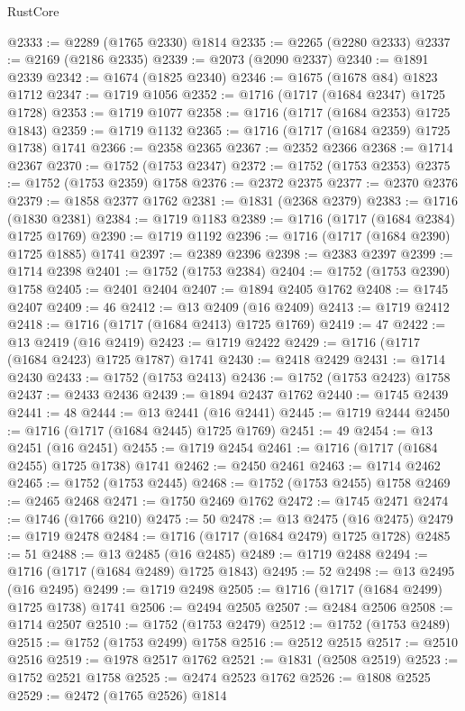 \begin{lexlean}{RustCore}
\begin{coremodule}
@2333 := @2289 (@1765 @2330) @1814
@2335 := @2265 (@2280 @2333)
@2337 := @2169 (@2186 @2335)
@2339 := @2073 (@2090 @2337)
@2340 := @1891 @2339
@2342 := @1674 (@1825 @2340)
@2346 := @1675 (@1678 @84) @1823 @1712
@2347 := @1719 @1056
@2352 := @1716 (@1717 (@1684 @2347) @1725 @1728)
@2353 := @1719 @1077
@2358 := @1716 (@1717 (@1684 @2353) @1725 @1843)
@2359 := @1719 @1132
@2365 := @1716 (@1717 (@1684 @2359) @1725 @1738) @1741
@2366 := @2358 @2365
@2367 := @2352 @2366
@2368 := @1714 @2367
@2370 := @1752 (@1753 @2347)
@2372 := @1752 (@1753 @2353)
@2375 := @1752 (@1753 @2359) @1758
@2376 := @2372 @2375
@2377 := @2370 @2376
@2379 := @1858 @2377 @1762
@2381 := @1831 (@2368 @2379)
@2383 := @1716 (@1830 @2381)
@2384 := @1719 @1183
@2389 := @1716 (@1717 (@1684 @2384) @1725 @1769)
@2390 := @1719 @1192
@2396 := @1716 (@1717 (@1684 @2390) @1725 @1885) @1741
@2397 := @2389 @2396
@2398 := @2383 @2397
@2399 := @1714 @2398
@2401 := @1752 (@1753 @2384)
@2404 := @1752 (@1753 @2390) @1758
@2405 := @2401 @2404
@2407 := @1894 @2405 @1762
@2408 := @1745 @2407
@2409 := 46
@2412 := @13 @2409 (@16 @2409)
@2413 := @1719 @2412
@2418 := @1716 (@1717 (@1684 @2413) @1725 @1769)
@2419 := 47
@2422 := @13 @2419 (@16 @2419)
@2423 := @1719 @2422
@2429 := @1716 (@1717 (@1684 @2423) @1725 @1787) @1741
@2430 := @2418 @2429
@2431 := @1714 @2430
@2433 := @1752 (@1753 @2413)
@2436 := @1752 (@1753 @2423) @1758
@2437 := @2433 @2436
@2439 := @1894 @2437 @1762
@2440 := @1745 @2439
@2441 := 48
@2444 := @13 @2441 (@16 @2441)
@2445 := @1719 @2444
@2450 := @1716 (@1717 (@1684 @2445) @1725 @1769)
@2451 := 49
@2454 := @13 @2451 (@16 @2451)
@2455 := @1719 @2454
@2461 := @1716 (@1717 (@1684 @2455) @1725 @1738) @1741
@2462 := @2450 @2461
@2463 := @1714 @2462
@2465 := @1752 (@1753 @2445)
@2468 := @1752 (@1753 @2455) @1758
@2469 := @2465 @2468
@2471 := @1750 @2469 @1762
@2472 := @1745 @2471
@2474 := @1746 (@1766 @210)
@2475 := 50
@2478 := @13 @2475 (@16 @2475)
@2479 := @1719 @2478
@2484 := @1716 (@1717 (@1684 @2479) @1725 @1728)
@2485 := 51
@2488 := @13 @2485 (@16 @2485)
@2489 := @1719 @2488
@2494 := @1716 (@1717 (@1684 @2489) @1725 @1843)
@2495 := 52
@2498 := @13 @2495 (@16 @2495)
@2499 := @1719 @2498
@2505 := @1716 (@1717 (@1684 @2499) @1725 @1738) @1741
@2506 := @2494 @2505
@2507 := @2484 @2506
@2508 := @1714 @2507
@2510 := @1752 (@1753 @2479)
@2512 := @1752 (@1753 @2489)
@2515 := @1752 (@1753 @2499) @1758
@2516 := @2512 @2515
@2517 := @2510 @2516
@2519 := @1978 @2517 @1762
@2521 := @1831 (@2508 @2519)
@2523 := @1752 @2521 @1758
@2525 := @2474 @2523 @1762
@2526 := @1808 @2525
@2529 := @2472 (@1765 @2526) @1814

\end{coremodule}
\end{lexlean}
